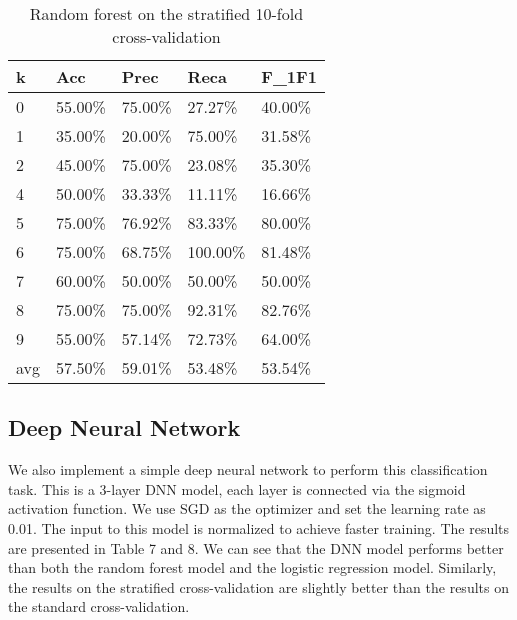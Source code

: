 \documentclass{article}
\begin{document}
\begin{table}[h]
	\centering
	\caption{Random forest on the stratified 10-fold cross-validation}
	\begin{tabular}{|l|l|l|l|l|}
	\hline
	\textbf{k} & \textbf{Acc} & \textbf{Prec} & \textbf{Reca} & \textbf{F\_1F1} \\ \hline
	0          & 55.00\%      & 75.00\%       & 27.27\%       & 40.00\%         \\ \hline
	1          & 35.00\%      & 20.00\%       & 75.00\%       & 31.58\%         \\ \hline
	2          & 45.00\%      & 75.00\%       & 23.08\%       & 35.30\%         \\ \hline
	4          & 50.00\%      & 33.33\%       & 11.11\%       & 16.66\%         \\ \hline
	5          & 75.00\%      & 76.92\%       & 83.33\%       & 80.00\%         \\ \hline
	6          & 75.00\%      & 68.75\%       & 100.00\%      & 81.48\%         \\ \hline
	7          & 60.00\%      & 50.00\%       & 50.00\%       & 50.00\%         \\ \hline
	8          & 75.00\%      & 75.00\%       & 92.31\%       & 82.76\%         \\ \hline
	9          & 55.00\%      & 57.14\%       & 72.73\%       & 64.00\%         \\ \hline
	avg        & 57.50\%      & 59.01\%       & 53.48\%       & 53.54\%         \\ \hline
	\end{tabular}
	\end{table}

\subsection*{Deep Neural Network}

We also implement a simple deep neural network to perform this classification task. This is a 3-layer DNN model, each layer is connected via the sigmoid activation function. We use SGD as the optimizer and set the learning rate as 0.01. The input to this model is normalized to achieve faster training. The results are presented in Table 7 and 8. We can see that the DNN model performs better than both the random forest model and the logistic regression model. Similarly, the results on the stratified cross-validation are slightly better than the results on the standard cross-validation.
\end{document}
